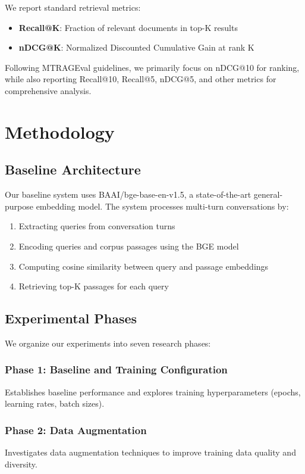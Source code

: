 \documentclass[11pt]{article}
\begin{document}
We report standard retrieval metrics:
\begin{itemize}
    \item \textbf{Recall@K}: Fraction of relevant documents in top-K results
    \item \textbf{nDCG@K}: Normalized Discounted Cumulative Gain at rank K
\end{itemize}

Following MTRAGEval guidelines, we primarily focus on nDCG@10 for ranking, while also reporting Recall@10, Recall@5, nDCG@5, and other metrics for comprehensive analysis.

\section{Methodology}

\subsection{Baseline Architecture}

Our baseline system uses BAAI/bge-base-en-v1.5, a state-of-the-art general-purpose embedding model. The system processes multi-turn conversations by:
\begin{enumerate}
    \item Extracting queries from conversation turns
    \item Encoding queries and corpus passages using the BGE model
    \item Computing cosine similarity between query and passage embeddings
    \item Retrieving top-K passages for each query
\end{enumerate}

\subsection{Experimental Phases}

We organize our experiments into seven research phases:

\subsubsection{Phase 1: Baseline and Training Configuration}
Establishes baseline performance and explores training hyperparameters (epochs, learning rates, batch sizes).

\subsubsection{Phase 2: Data Augmentation}
Investigates data augmentation techniques to improve training data quality and diversity.
\end{document}
